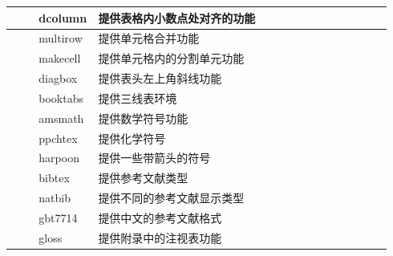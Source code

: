 \documentclass[12pt]{book}
\begin{document}
\begin{longtable}[htbp]
\begin{tabular}{|>{\centering\hspace{0pt}}m{0.075\linewidth}|>{\hspace{0pt}}m{0.084\linewidth}|>{\hspace{0pt}}m{0.779\linewidth}|}
		\cline{2-3}
		& dcolumn                                                             & 提供表格内小数点处对齐的功能                                                                    \\ 
		\cline{2-3}
		& multirow                                                            & 提供单元格合并功能                                                                         \\ 
		\cline{2-3}
		& makecell                                                            & 提供单元格内的分割单元功能                                                                     \\ 
		\cline{2-3}
		& diagbox                                                             & 提供表头左上角斜线功能                                                                       \\ 
		\cline{2-3}
		& booktabs                                                            & 提供三线表环境                                                                           \\ 
		\hline
		\multirow{3}{0.075\linewidth}{\hspace{0pt}\centering{}}     & amsmath                                                             & 提供数学符号功能                                                                          \\ 
		\cline{2-3}
		& ppchtex                                                             & 提供化学符号                                                                            \\ 
		\cline{2-3}
		& harpoon                                                             & 提供一些带箭头的符号                                                                        \\ 
		\hline
		\multirow{4}{0.075\linewidth}{\hspace{0pt}\centering{}参考文献} & bibtex                                                              & 提供参考文献类型                                                                          \\ 
		\cline{2-3}
		& natbib                                                              & 提供不同的参考文献显示类型                                                                     \\ 
		\cline{2-3}
		& gbt7714                                                             & 提供中文的参考文献格式                                                                       \\ 
		\cline{2-3}
		& gloss                                                               & 提供附录中的注视表功能                                                                       \\
		\hline
	\end{tabular}
\end{longtable}
\end{document}
